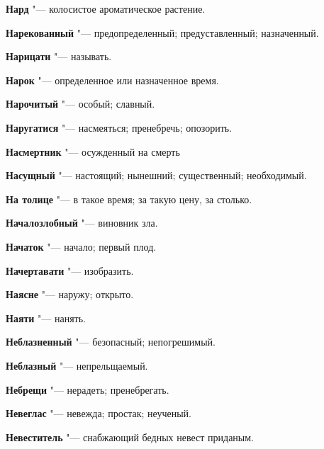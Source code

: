\begin{mymulticols}{2}
\noindent\textbf{Нард} "--- колосистое ароматическое растение. 




\noindent\textbf{Нарекованный} "--- предопределенный; предуставленный; назначенный. 




\noindent\textbf{Нарицати} "--- называть. 




\noindent\textbf{Нарок} "--- определенное или назначенное время. 




\noindent\textbf{Нарочитый} "--- особый; славный. 




\noindent\textbf{Наругатися} "--- насмеяться; пренебречь; опозорить. 




\noindent\textbf{Насмертник} "--- осужденный на смерть 




\noindent\textbf{Насущный} "--- настоящий; нынешний; существенный; необходимый. 




\noindent\textbf{На толице} "--- в такое время; за такую цену, за столько. 




\noindent\textbf{Началозлобный} "--- виновник зла. 




\noindent\textbf{Начаток} "--- начало; первый плод. 




\noindent\textbf{Начертавати} "--- изобразить. 




\noindent\textbf{Наясне} "--- наружу; открыто. 




\noindent\textbf{Наяти} "--- нанять. 




\noindent\textbf{Неблазненный} "--- безопасный; непогрешимый. 




\noindent\textbf{Неблазный} "--- непрельщаемый. 




\noindent\textbf{Небрещи} "--- нерадеть; пренебрегать. 




\noindent\textbf{Невеглас} "--- невежда; простак; неученый. 




\noindent\textbf{Невеститель} "--- снабжающий бедных невест приданым. 





\end{mymulticols}
